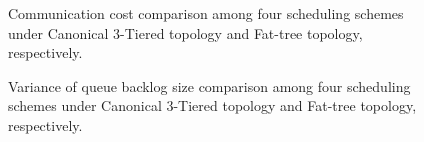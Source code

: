 \documentclass[10pt,journal,compsoc]{IEEEtran}
\begin{document}
\begin{figure}[!t]
\centering
 \caption{Communication cost comparison among four scheduling schemes under Canonical 3-Tiered topology and Fat-tree topology, respectively.}
 \label{cost_trace}
\end{figure}


\begin{figure}[!t]
\centering
 \caption{Variance of queue backlog size comparison among four scheduling schemes under Canonical 3-Tiered topology and Fat-tree topology, respectively.}
 \label{var_trace}
\end{figure}
\end{document}
